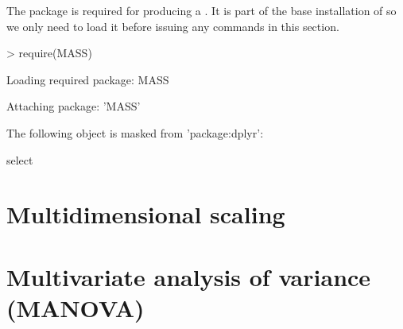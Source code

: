 The  package is required for producing a . It is part of the base installation of \R{} so we only need to load it before issuing any commands in this section. 
\begin{Schunk}
\begin{Sinput}
> require(MASS) 
\end{Sinput}
\begin{Soutput}
Loading required package: MASS
\end{Soutput}
\begin{Soutput}

Attaching package: 'MASS'
\end{Soutput}
\begin{Soutput}
The following object is masked from 'package:dplyr':

    select
\end{Soutput}
\end{Schunk}
 
\section{Multidimensional scaling} 
 
\section{Multivariate analysis of variance (MANOVA)} 
 
 
\section{} 
 
 
\section{} 
 
 
\section{} 
 
 
\section{} 
 
 
\section{} 
 
 
\section{} 
 
 
 

